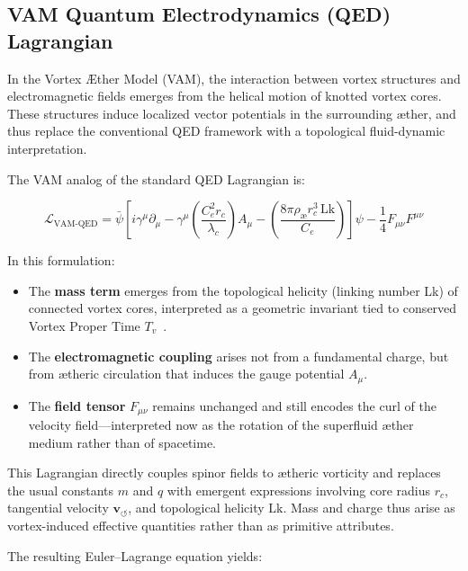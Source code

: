 \subsection*{VAM Quantum Electrodynamics (QED) Lagrangian}

In the Vortex Æther Model (VAM), the interaction between vortex structures and electromagnetic fields emerges from the helical motion of knotted vortex cores. These structures induce localized vector potentials in the surrounding æther, and thus replace the conventional QED framework with a topological fluid-dynamic interpretation.

The VAM analog of the standard QED Lagrangian is:

\begin{equation}
    \mathcal{L}_\text{VAM-QED} =
    \bar{\psi} \left[ i \gamma^\mu \partial_\mu
                   - \gamma^\mu \left( \frac{C_e^2 r_c}{\lambda_c} \right) A_\mu
                   - \left( \frac{8\pi \rho_\text{\ae} r_c^3 \, \text{Lk}}{C_e} \right) \right] \psi
    - \frac{1}{4} F_{\mu\nu} F^{\mu\nu}
\end{equation}

In this formulation:
\begin{itemize}
    \item The \textbf{mass term} emerges from the topological helicity (linking number Lk) of connected vortex cores, interpreted as a geometric invariant tied to conserved Vortex Proper Time \( T_v \)~\cite{volovik2003}.
    \item The \textbf{electromagnetic coupling} arises not from a fundamental charge, but from ætheric circulation that induces the gauge potential \( A_\mu \).
    \item The \textbf{field tensor} \( F_{\mu\nu} \) remains unchanged and still encodes the curl of the velocity field—interpreted now as the rotation of the superfluid æther medium rather than of spacetime.
\end{itemize}

This Lagrangian directly couples spinor fields to ætheric vorticity and replaces the usual constants \( m \) and \( q \) with emergent expressions involving core radius \( r_c \), tangential velocity \( \mathbf{v}_{\scriptscriptstyle\boldsymbol{\circlearrowleft}} \), and topological helicity \( \text{Lk} \). Mass and charge thus arise as vortex-induced effective quantities rather than as primitive attributes.

The resulting Euler–Lagrange equation yields:

